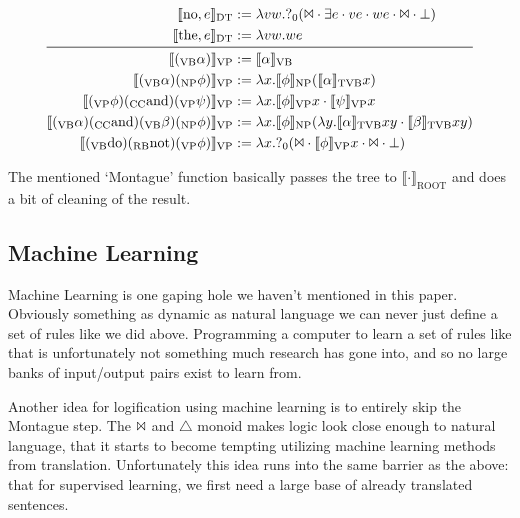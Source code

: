 \documentclass[12pt]{article}
\begin{document}
\begin{equation*}
\begin{aligned}
\llbracket \text{no}, e\rrbracket_\text{DT} &:= \lambda vw.?_0(\Bowtie\cdot\exists e\cdot ve\cdot we\cdot\Bowtie\cdot\bot)\\
\llbracket \text{the}, e\rrbracket_\text{DT} &:= \lambda vw.we\\
\midrule\ 
%
\llbracket (_\text{VB}\alpha)\rrbracket_\text{VP} &:= \llbracket \alpha\rrbracket_\text{VB}\\
\llbracket (_\text{VB}\alpha)(_\text{NP}\phi)\rrbracket_\text{VP} &:= \lambda x.\llbracket \phi\rrbracket_\text{NP} (\llbracket \alpha\rrbracket_\text{TVB} x)\\
\llbracket (_\text{VP}\phi)(_\text{CC}\text{and})(_\text{VP}\psi)\rrbracket_\text{VP} &:= \lambda x.\llbracket \phi\rrbracket_\text{VP}x\cdot \llbracket \psi\rrbracket_\text{VP}x\\
\llbracket (_\text{VB}\alpha)(_\text{CC}\text{and})(_\text{VB}\beta)(_\text{NP}\phi)\rrbracket_\text{VP} &:= \lambda x.\llbracket \phi\rrbracket_\text{NP}(\lambda y.\llbracket \alpha\rrbracket_\text{TVB}xy\cdot \llbracket \beta\rrbracket_\text{TVB}xy)\\
\llbracket (_\text{VB}\text{do})(_\text{RB}\text{not})(_\text{VP}\phi)\rrbracket_\text{VP} &:= \lambda x.?_0(\Bowtie\cdot\llbracket \phi\rrbracket_\text{VP}x\cdot\Bowtie\cdot\bot)
\end{aligned}\end{equation*}

The mentioned `Montague' function basically passes the tree to $\llbracket\cdot\rrbracket_\text{ROOT}$ and does a bit of cleaning of the result.

\subsection{Machine Learning}

Machine Learning is one gaping hole we haven't mentioned in this paper. Obviously something as dynamic as natural language we can never just define a set of rules like we did above. Programming a computer to learn a set of rules like that is unfortunately not something much research has gone into, and so no large banks of input/output pairs exist to learn from.

Another idea for logification using machine learning is to entirely skip the Montague step. The $\Bowtie$ and $\triangle$ monoid makes logic look close enough to natural language, that it starts to become tempting utilizing machine learning methods from translation. Unfortunately this idea runs into the same barrier as the above: that for supervised learning, we first need a large base of already translated sentences.
\end{document}
